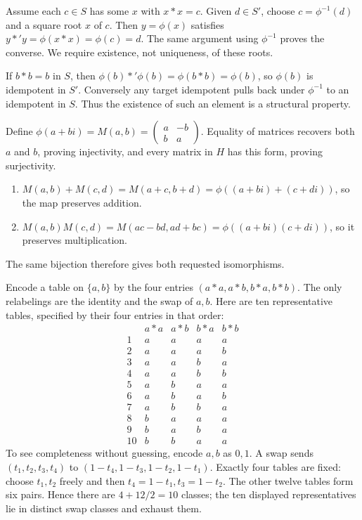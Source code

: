 
Assume each $c\in S$ has some $x$ with $x*x=c$. Given $d\in S'$, choose $c=\phi^{-1}(d)$ and a square root $x$ of $c$. Then $y=\phi(x)$ satisfies $y*'y=\phi(x*x)=\phi(c)=d$. The same argument using $\phi^{-1}$ proves the converse. We require existence, not uniqueness, of these roots.


If $b*b=b$ in $S$, then $\phi(b)*'\phi(b)=\phi(b*b)=\phi(b)$, so $\phi(b)$ is idempotent in $S'$. Conversely any target idempotent pulls back under $\phi^{-1}$ to an idempotent in $S$. Thus the existence of such an element is a structural property.


Define $\phi(a+bi)=M(a,b)=\begin{pmatrix}a&-b\\b&a\end{pmatrix}$. Equality of matrices recovers both $a$ and $b$, proving injectivity, and every matrix in $H$ has this form, proving surjectivity.
\begin{enumerate}[label=(\alph*)]
\item $M(a,b)+M(c,d)=M(a+c,b+d)=\phi((a+bi)+(c+di))$, so the map preserves addition.
\item $M(a,b)M(c,d)=M(ac-bd,ad+bc)=\phi((a+bi)(c+di))$, so it preserves multiplication.
\end{enumerate}
The same bijection therefore gives both requested isomorphisms.


Encode a table on $\{a,b\}$ by the four entries $(a*a,a*b,b*a,b*b)$. The only relabelings are the identity and the swap of $a,b$. Here are ten representative tables, specified by their four entries in that order:
\[\begin{array}{c|cccc} &a*a&a*b&b*a&b*b\\\hline
1&a&a&a&a\\2&a&a&a&b\\3&a&a&b&a\\4&a&a&b&b\\5&a&b&a&a\\6&a&b&a&b\\7&a&b&b&a\\8&b&a&a&a\\9&b&a&b&a\\10&b&b&a&a
\end{array}\]
To see completeness without guessing, encode $a,b$ as $0,1$. A swap sends $(t_1,t_2,t_3,t_4)$ to $(1-t_4,1-t_3,1-t_2,1-t_1)$. Exactly four tables are fixed: choose $t_1,t_2$ freely and then $t_4=1-t_1,t_3=1-t_2$. The other twelve tables form six pairs. Hence there are $4+12/2=10$ classes; the ten displayed representatives lie in distinct swap classes and exhaust them.
